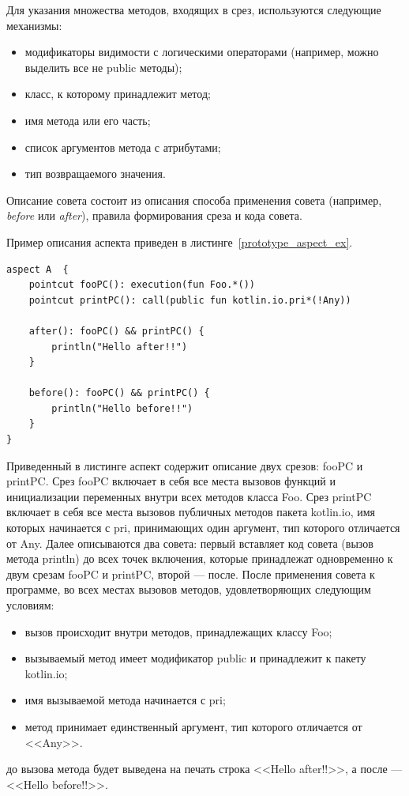 \documentclass[conference]{IEEEtran}
\begin{document}
Для указания множества методов, входящих в срез, используются следующие
механизмы:
\begin{itemize}
    \item модификаторы видимости с логическими операторами (например, можно
          выделить все не public методы);
    \item класс, к которому принадлежит метод;
    \item имя метода или его часть;
    \item список аргументов метода с атрибутами;
    \item тип возвращаемого значения.
\end{itemize}
Описание совета состоит из описания способа применения совета (например,
\textit{before} или \textit{after}), правила формирования среза и кода совета.

Пример описания аспекта приведен в листинге~\ref{prototype_aspect_ex}.
\begin{lstlisting}[label=prototype_aspect_ex,
    caption={Пример описания аспекта}]
aspect A  {
    pointcut fooPC(): execution(fun Foo.*())
    pointcut printPC(): call(public fun kotlin.io.pri*(!Any))

    after(): fooPC() && printPC() {
        println("Hello after!!")
    }

    before(): fooPC() && printPC() {
        println("Hello before!!")
    }
}
\end{lstlisting}
Приведенный в листинге аспект содержит описание двух срезов: fooPC и printPC.
Срез fooPC включает в себя все места вызовов функций и инициализации переменных
внутри всех методов класса Foo.
Срез printPC включает в себя все места вызовов публичных методов пакета
kotlin.io, имя которых начинается с pri, принимающих один аргумент, тип
которого отличается от Any.
Далее описываются два совета: первый вставляет код совета (вызов метода println) 
до всех точек включения, которые принадлежат одновременно к двум срезам fooPC и
printPC, второй --- после.
После применения совета к программе, во всех местах вызовов методов,
удовлетворяющих следующим условиям:
\begin{itemize}
	\item вызов происходит внутри методов, принадлежащих классу Foo;
	\item вызываемый метод имеет модификатор public и принадлежит к пакету
		  kotlin.io;
	\item имя вызываемой метода начинается с pri;
	\item метод принимает единственный аргумент, тип которого отличается от
	      <<Any>>.
\end{itemize}
 до вызова метода будет выведена на печать строка <<Hello after!!>>, а после ---
<<Hello before!!>>.
\end{document}
